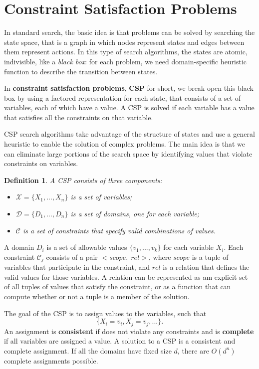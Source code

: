 \documentclass{article}
\newtheorem{definition}{Definition}
\begin{document}
\newpage
\section{Constraint Satisfaction Problems}
In standard search, the basic idea is that problems can be solved by searching the state space, that is a graph in which nodes represent states and edges between them represent actions. In this type of search algorithms, the states are atomic, indivisible, like a \textit{black box}: for each problem, we need domain-specific heuristic function to describe the transition between states.

In \textbf{constraint satisfaction problems}, \textbf{CSP} for short, we break open this black box by using a factored representation for each state, that consists of a set of variables, each of which have a value. A CSP is solved if each variable has a value that satisfies all the constraints on that variable.

CSP search algorithms take advantage of the structure of states and use a general heuristic to enable the solution of complex problems. The main idea is that we can eliminate large portions of the search space by identifying values that violate constraints on variables.  \\

\begin{definition}
A CSP consists of three components:
\begin{itemize}
    \item $\mathcal{X} =\{X_1, ..., X_n\}$ is a set of variables;
    \item $\mathcal{D} =\{D_1, ..., D_n\}$ is a set of domains, one for each variable;
    \item $\mathcal{C}$ is a set of constraints that specify valid combinations of values.
\end{itemize}
\end{definition}

A domain $D_i$ is a set of allowable values $\{v_1, ..., v_k\}$ for each variable $X_i$. Each constraint $\mathcal{C}_j$ consists of a pair $<scope,\; rel>$, where $scope$ is a tuple of variables that participate in the constraint, and $rel$ is a relation that defines the valid values for those variables. A relation can be represented as am explicit set of all tuples of values that satisfy the constraint, or as a function that can compute whether or not a tuple is a member of the solution.

The goal of the CSP is to assign values to the variables, such that 
\[\{X_i=v_i, X_j=v_j, ...\}.\] 
An assignment is \textbf{consistent} if does not violate any constraints and is \textbf{complete} if all variables are assigned a value. A solution to a CSP is a consistent and complete assignment. If all the domains have fixed size $d$, there are $O(d^n)$ complete assignments possible.
\end{document}
